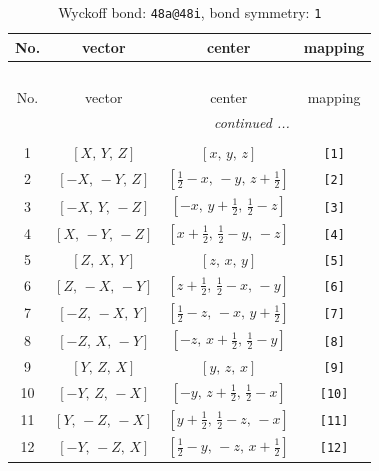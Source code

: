 \documentclass[fleqn,8pt]{jsarticle}
\begin{document}
\begin{longtable}{cccc}
\caption{Wyckoff bond: {\tt 48a@48i}, bond symmetry: {\tt 1}}
 \\
 \hline \hline
No. & vector & center & mapping \\ \hline \endfirsthead

\multicolumn{3}{l}{\tablename\ \thetable{}} \\
 \hline \hline
No. & vector & center & mapping \\ \hline \endhead

 \hline \hline
\multicolumn{3}{r}{\footnotesize\it continued ...} \\ \endfoot

 \hline \hline
\multicolumn{3}{r}{} \\ \endlastfoot

1 & $\left[ X,\, Y,\, Z \right]$ & $\left[ x,\, y,\, z \right]$ & {\tt [1]} \\ \hline
2 & $\left[ - X,\, - Y,\, Z \right]$ & $\left[ \frac{1}{2} - x,\, - y,\, z + \frac{1}{2} \right]$ & {\tt [2]} \\ \hline
3 & $\left[ - X,\, Y,\, - Z \right]$ & $\left[ - x,\, y + \frac{1}{2},\, \frac{1}{2} - z \right]$ & {\tt [3]} \\ \hline
4 & $\left[ X,\, - Y,\, - Z \right]$ & $\left[ x + \frac{1}{2},\, \frac{1}{2} - y,\, - z \right]$ & {\tt [4]} \\ \hline
5 & $\left[ Z,\, X,\, Y \right]$ & $\left[ z,\, x,\, y \right]$ & {\tt [5]} \\ \hline
6 & $\left[ Z,\, - X,\, - Y \right]$ & $\left[ z + \frac{1}{2},\, \frac{1}{2} - x,\, - y \right]$ & {\tt [6]} \\ \hline
7 & $\left[ - Z,\, - X,\, Y \right]$ & $\left[ \frac{1}{2} - z,\, - x,\, y + \frac{1}{2} \right]$ & {\tt [7]} \\ \hline
8 & $\left[ - Z,\, X,\, - Y \right]$ & $\left[ - z,\, x + \frac{1}{2},\, \frac{1}{2} - y \right]$ & {\tt [8]} \\ \hline
9 & $\left[ Y,\, Z,\, X \right]$ & $\left[ y,\, z,\, x \right]$ & {\tt [9]} \\ \hline
10 & $\left[ - Y,\, Z,\, - X \right]$ & $\left[ - y,\, z + \frac{1}{2},\, \frac{1}{2} - x \right]$ & {\tt [10]} \\ \hline
11 & $\left[ Y,\, - Z,\, - X \right]$ & $\left[ y + \frac{1}{2},\, \frac{1}{2} - z,\, - x \right]$ & {\tt [11]} \\ \hline
12 & $\left[ - Y,\, - Z,\, X \right]$ & $\left[ \frac{1}{2} - y,\, - z,\, x + \frac{1}{2} \right]$ & {\tt [12]} \\ \hline

\end{longtable}
\end{document}
